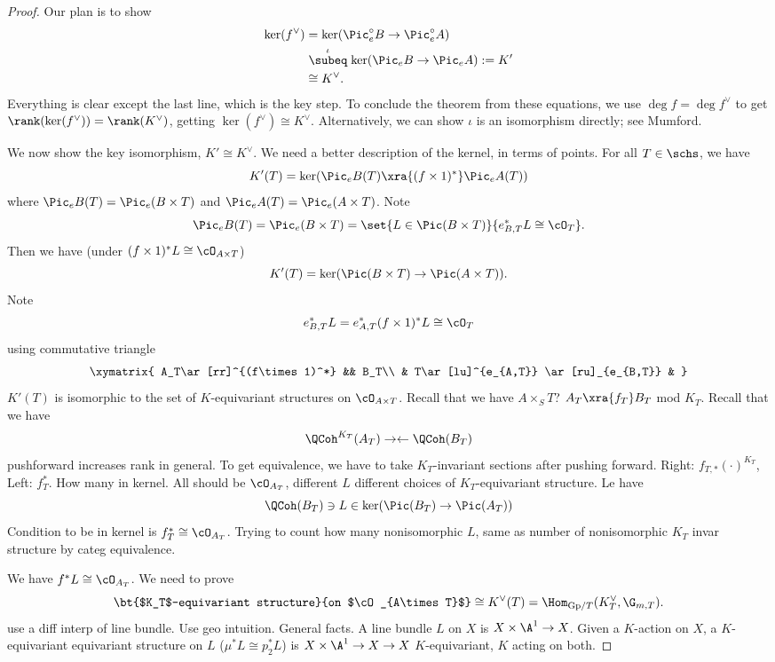 \begin{proof}
Our plan is to show
\begin{align*}
\ker(f^{\vee})&=\ker(\Pic_e^{\circ} B\to \Pic_e^{\circ} A)\\
&\stackrel{\iota}{\subeq} \ker(\Pic_e B\to \Pic_e A):=K'\\
&\cong K^{\vee}.
\end{align*}
Everything is clear except the last line, which is the key step. To conclude the theorem from these equations, we use $\deg f=\deg f^{\vee}$ to get $\rank(\ker(f^{\vee}))=\rank (K^{\vee})$, getting $\ker(f^{\vee})\cong K^{\vee}$. Alternatively, we can show $\iota$ is an isomorphism directly; see Mumford.

We now show the key isomorphism, $K'\cong K^{\vee}$. We need a better description of the kernel, in terms of points. For all $T\in \schs$, we have 
\[%
K'(T)=\ker (\Pic_e B(T)\xra{(f\times 1)^*} \Pic_e A(T))
\]
where $\Pic_e B(T)=\Pic_e(B\times T)$ and $\Pic_e A(T)=\Pic_e (A\times T)$. Note
\[
\Pic_e B(T)=\Pic_e(B\times T)=\set{L\in \Pic(B\times T)}{e_{B,T}^* L\cong \cO_T}.
\]
Then we have (under $(f\times1)^* L\cong \cO_{A\times T}$)
\[
K'(T)=\ker (\Pic(B\times T)\to \Pic (A\times T)).
\]
Note
\[
e_{B,T}^*L = e_{A,T}^* (f\times 1)^*L \cong \cO_T
\]
using commutative triangle
\[
\xymatrix{
A_T\ar[rr]^{(f\times1)^*} && B_T\\
& T\ar[lu]^{e_{A,T}} \ar[ru]_{e_{B,T}} &
}
\]
$K'(T)$ is isomorphic to the set of {$K$-equivariant} {structures on $\cO_{A\times T}$}. Recall that we have $A\times_S T$? $A_T\xra{f_T} B_T$ mod $K_T$. Recall that we have
\[
\QCoh^{K_T}(A_T) \rightarrow\leftarrow \QCoh(B_T)
\]
pushforward increases rank in general. To get equivalence, we have to take $K_T$-invariant sections after pushing forward. 
Right: $f_{T,*}(\cdot)^{K_T}$, Left: $f_T^*$. How many in kernel. All should be $\cO_{A_T}$, different $L$ different choices of $K_T$-equivariant structure. Le have
\[
\QCoh(B_T)\ni L\in \ker(\Pic(B_T)\to \Pic(A_T))
\]
Condition to be in kernel is $f_T^* \cong \cO_{A_T}$. Trying to count how many nonisomorphic $L$, same as number of nonisomorphic $K_T$ invar structure by categ equivalence.

We have $f^*L\cong \cO_{A_T}$. We need to prove
\[
\bt{$K_T$-equivariant structure}{on $\cO_{A\times T}$}\cong K^{\vee}(T) =\Hom_{\text{Gp}/T}(K_T^{\vee},\G_{m,T}).
\]
use a diff interp of line bundle. Use geo intuition. General facts. 
A line bundle $L$ on $X$ is $X\times \A^1\to X$. Given a $K$-action on $X$, a $K$-equivariant equivariant structure on $L$  ($\mu^*L\cong p_2^*L$) is $X\times \A^1\to X\to X$ $K$-equivariant, $K$ acting on both. 


\end{proof}
